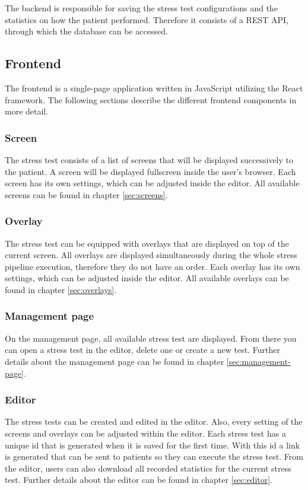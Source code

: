 The backend is responsible for saving the stress test configurations and the statistics on how the patient performed.
Therefore it consists of a REST API, through which the database can be accessed.

\subsection{Frontend}
The frontend is a single-page application written in JavaScript utilizing the React framework. 
The following sections describe the different frontend components in more detail.

\subsubsection*{Screen}
The stress test consists of a list of screens that will be displayed successively to the patient. 
A screen will be displayed fullscreen inside the user's browser. 
Each screen has its own settings, which can be adjusted inside the editor. 
All available screens can be found in chapter \ref{sec:screens}.

\subsubsection*{Overlay}
The stress test can be equipped with overlays that are displayed on top of the current screen. 
All overlays are displayed simultaneously during the whole stress pipeline execution, therefore they do not have an order. 
Each overlay has its own settings, which can be adjusted inside the editor.
All available overlays can be found in chapter \ref{sec:overlays}.

\subsubsection*{Management page}
On the management page, all available stress test are displayed.
From there you can open a stress test in the editor, delete one or create a new test.
Further details about the management page can be found in chapter \ref{sec:management-page}.

\subsubsection*{Editor}
The stress tests can be created and edited in the editor.
Also, every setting of the screens and overlays can be adjusted within the editor.
Each stress test has a unique id that is generated when it is saved for the first time.
With this id a link is generated that can be sent to patients so they can execute the stress test.
From the editor, users can also download all recorded statistics for the current stress test.
Further details about the editor can be found in chapter \ref{sec:editor}.

